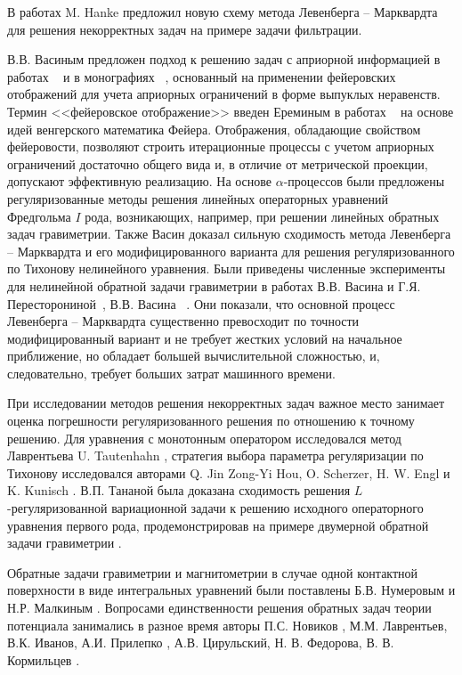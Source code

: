 {В работах \cite{Han1997,Han2010} M. Hanke предложил новую схему метода Левенберга -- Марквардта для решения некорректных задач на примере задачи фильтрации.

В.В. Васиным предложен подход к решению задач с априорной информацией в работах ~\cite{Vas1982, Vas1988} и в монографиях ~\cite{VasAge1993, VasEre2009}, основанный на применении фейеровских отображений для учета априорных ограничений в форме выпуклых неравенств. Термин <<фейеровское отображение>> введен Ереминым в работах ~\cite{Ere1965, Ere1966, Ere1968} на основе идей венгерского математика Фейера. Отображения, обладающие свойством фейеровости, позволяют строить итерационные процессы с учетом априорных ограничений достаточно общего вида и, в отличие от метрической проекции, допускают эффективную реализацию. На основе $\alpha$-процессов были предложены регуляризованные методы решения линейных операторных уравнений Фредгольма $I$ рода, возникающих, например, при решении линейных обратных задач гравиметрии. Также Васин доказал сильную сходимость метода Левенберга -- Марквардта и его модифицированного варианта для решения регуляризованного по Тихонову нелинейного уравнения. Были приведены численные эксперименты для нелинейной обратной задачи гравиметрии в работах В.В. Васина и Г.Я. Пересторониной~\cite{VasPer_2011}, В.В. Васина ~\cite{Vasin_2012}. Они показали, что основной процесс Левенберга -- Марквардта существенно превосходит по точности модифицированный вариант и не требует жестких условий на начальное приближение, но обладает большей вычислительной сложностью, и, следовательно, требует больших затрат машинного времени.

При исследовании методов решения некорректных задач важное место занимает оценка погрешности регуляризованного решения по отношению к точному решению. Для уравнения с монотонным оператором исследовался метод Лаврентьева U. Tautenhahn \cite{Tau2002,Tau2004}, стратегия выбора параметра регуляризации по Тихонову исследовался авторами Q. Jin Zong-Yi Hou, O. Scherzer, H. W. Engl и K. Kunisch \cite{JinZon1997,JinZon1999,SchEngKun1993}. В.П. Тананой была доказана сходимость решения $L$-регуляризованной вариационной задачи к решению исходного операторного уравнения первого рода, продемонстрировав на примере двумерной обратной задачи гравиметрии \cite{Tan2003_2}.

Обратные задачи гравиметрии и магнитометрии в случае одной контактной поверхности в виде интегральных уравнений были поставлены Б.В. Нумеровым и Н.Р. Малкиным \cite{Num1930, Mal1931}. Вопросами единственности решения обратных задач теории потенциала занимались в разное время авторы П.С. Новиков \cite{Nov1938}, М.М. Лаврентьев, В.К. Иванов, А.И. Прилепко \cite{Pri1965}, А.В. Цирульский, Н. В. Федорова, В. В. Кормильцев \cite{FedTsi1976,TsiKor1990}.

}
